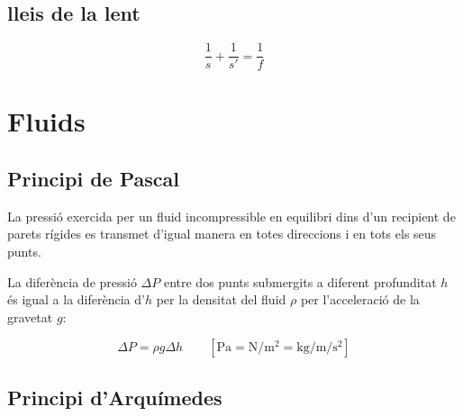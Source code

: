 \subsection{lleis de la lent}
\begin{equation}
    \frac{1}{s} + \frac{1}{s'} = \frac{1}{f}
\end{equation}


\section{Fluids}
\label{sec:fluids}

\subsection{Principi de Pascal}
\label{sub:principi_de_pascal}

\begin{displayquote}
    La pressió exercida per un fluid incompressible en equilibri dins d'un
    recipient de parets rígides es transmet d'igual manera en totes direccions i en
    tots els seus punts.
\end{displayquote}

La diferència de pressió $\Delta P$ entre dos punts submergits a diferent
profunditat $h$ és igual a la diferència d'$h$ per la densitat del fluid $\rho$
per l'acceleració de la gravetat $g$:

\begin{equation}
    \Delta P = \rho g \Delta h \qquad \left[ \si{\pascal} = \si{\newton \per \metre \squared} = \si{\kilo \gram \per\metre \per\second\squared} \right]
\end{equation}

\begin{center}
\end{center}

\subsection{Principi d'Arquímedes}
\label{sub:principi_d_arquimedes}

